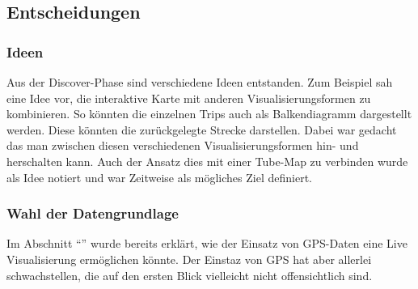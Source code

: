 \subsection{Entscheidungen}
\label{sub:entscheidungen}

  \subsubsection{Ideen}
  \label{ssub:ideen}
    Aus der Discover-Phase sind verschiedene Ideen entstanden. Zum Beispiel sah eine Idee vor, die interaktive Karte mit anderen Visualisierungsformen zu kombinieren. So könnten die einzelnen Trips auch als Balkendiagramm dargestellt werden. Diese könnten die zurückgelegte Strecke darstellen. Dabei war gedacht das man zwischen diesen verschiedenen Visualisierungsformen hin- und herschalten kann. Auch der Ansatz dies mit einer Tube-Map zu verbinden wurde als Idee notiert und war Zeitweise als mögliches Ziel definiert. 


    \subsubsection{Wahl der Datengrundlage}
  \label{ssub:wahl_der_datengrundlage}
    Im Abschnitt "`"' wurde bereits erklärt, wie der Einsatz von GPS-Daten eine Live Visualisierung ermöglichen könnte. Der Einstaz von GPS hat aber allerlei schwachstellen, die auf den ersten Blick vielleicht nicht offensichtlich sind.


